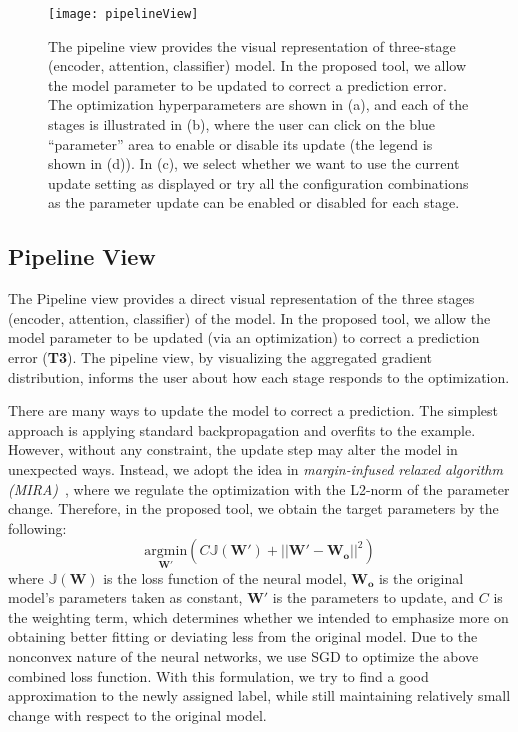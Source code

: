 \begin{figure}[htbp]
\centering
\vspace{-2mm}
 \texttt{[image: pipelineView]}
 \vspace{-3mm}
 \caption{
The pipeline view provides the visual representation of three-stage (encoder, attention, classifier) model. 
In the proposed tool, we allow the model parameter to be updated to correct a prediction error. 
The optimization hyperparameters are shown in (a), and each of the stages is illustrated in (b), where the user can click on the blue ``parameter'' area to enable or disable its update (the legend is shown in (d)). In (c), we select whether we want to use the current update setting as displayed or try all the configuration combinations as the parameter update can be enabled or disabled for each stage.
 }
\label{fig:pipelineView}
\vspace{-2mm}
\end{figure}

\subsection{Pipeline View}
\label{sec:pipeline}
The Pipeline view provides a direct visual representation of the three stages (encoder, attention, classifier) of the model. In the proposed tool, we allow the model parameter to be updated (via an optimization) to correct a prediction error (\textbf{T3}). The pipeline view, by visualizing the aggregated gradient distribution, informs the user about how each stage responds to the optimization.

There are many ways to update the model to correct a prediction. The simplest approach is applying standard backpropagation and overfits to the example. However, without any constraint, the update step may alter the model in unexpected ways.
Instead, we adopt the idea in \emph{margin-infused relaxed algorithm (MIRA)}~\cite{CrammerSinger2003}, where we regulate the optimization with the L2-norm of the parameter change. Therefore, in the proposed tool, we obtain the target parameters by the following:
\begin{equation}
\underset{\mathbf{W}'}{\mathrm{argmin}}( C \mathbb{J}(\mathbf{W}') + ||\mathbf{W}' - \mathbf{W_o}||^2)
\end{equation}
where $\mathbb{J}(\mathbf{W})$ is the loss function of the neural model, $\mathbf{W_o}$ is the original model's parameters taken as constant, $\mathbf{W}'$ is the parameters to update, and $C$ is the weighting term, which determines whether we intended to emphasize more on obtaining better fitting or deviating less from the original model. Due to the nonconvex nature of the neural networks, we use SGD to optimize the above combined loss function.
%
With this formulation, we try to find a good approximation to the newly assigned label, while still maintaining relatively small change with respect to the original model.

